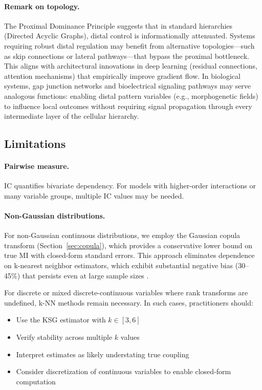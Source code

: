 \documentclass[10pt]{article} %
\theoremstyle{plain}
\theoremstyle{definition}
\begin{document}
\paragraph{Remark on topology.} The Proximal Dominance Principle suggests that in standard hierarchies (Directed Acyclic Graphs), distal control is informationally attenuated. Systems requiring robust distal regulation may benefit from alternative topologies---such as skip connections or lateral pathways---that bypass the proximal bottleneck. This aligns with architectural innovations in deep learning (residual connections, attention mechanisms) that empirically improve gradient flow. In biological systems, gap junction networks and bioelectrical signaling pathways may serve analogous functions: enabling distal pattern variables (e.g., morphogenetic fields) to influence local outcomes without requiring signal propagation through every intermediate layer of the cellular hierarchy.

\subsection{Limitations}

\paragraph{Pairwise measure.} IC quantifies bivariate dependency. For models with higher-order interactions or many variable groups, multiple IC values may be needed.

\paragraph{Non-Gaussian distributions.} For non-Gaussian continuous distributions, we employ the Gaussian copula transform (Section~\ref{sec:copula}), which provides a conservative lower bound on true MI with closed-form standard errors. This approach eliminates dependence on k-nearest neighbor estimators, which exhibit substantial negative bias (30--45\%) that persists even at large sample sizes \citep{vandenberg2025linfoot}.

For discrete or mixed discrete-continuous variables where rank transforms are undefined, k-NN methods remain necessary. In such cases, practitioners should:
\begin{itemize}
    \item Use the KSG estimator with $k \in [3, 6]$
    \item Verify stability across multiple $k$ values
    \item Interpret estimates as likely understating true coupling
    \item Consider discretization of continuous variables to enable closed-form computation
\end{itemize}
\end{document}
